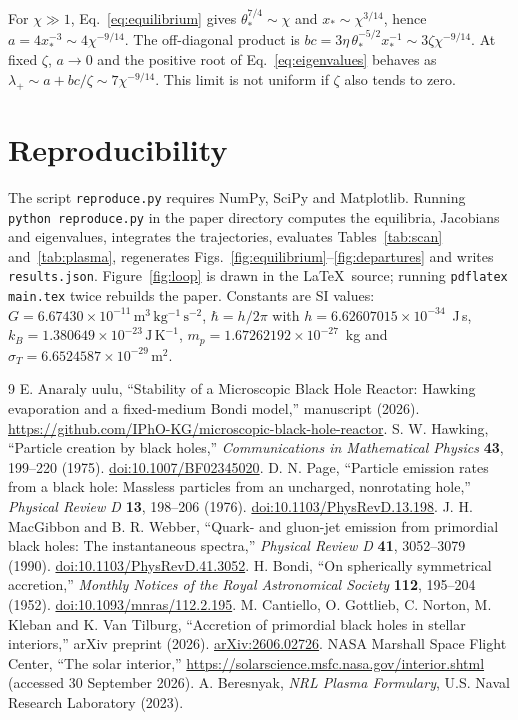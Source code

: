 \documentclass[11pt,a4paper]{article}
\begin{document}
For $\chi\gg1$, Eq.~\eqref{eq:equilibrium} gives $\theta_*^{7/4}\sim\chi$ and $x_*\sim\chi^{3/14}$, hence $a=4x_*^{-3}\sim4\chi^{-9/14}$. The off-diagonal product is $bc=3\eta\,\theta_*^{-5/2}x_*^{-1}\sim3\zeta\chi^{-9/14}$. At fixed $\zeta$, $a\to0$ and the positive root of Eq.~\eqref{eq:eigenvalues} behaves as $\lambda_+\sim a+bc/\zeta\sim7\chi^{-9/14}$. This limit is not uniform if $\zeta$ also tends to zero.

\section{Reproducibility}\label{app:repro}
The script \texttt{reproduce.py} requires NumPy, SciPy and Matplotlib. Running \texttt{python reproduce.py} in the paper directory computes the equilibria, Jacobians and eigenvalues, integrates the trajectories, evaluates Tables~\ref{tab:scan} and~\ref{tab:plasma}, regenerates Figs.~\ref{fig:equilibrium}--\ref{fig:departures} and writes \texttt{results.json}. Figure~\ref{fig:loop} is drawn in the \LaTeX\ source; running \texttt{pdflatex main.tex} twice rebuilds the paper. Constants are SI values: $G=6.67430\times10^{-11}\,\mathrm{m^3\,kg^{-1}\,s^{-2}}$, $\hbar=h/2\pi$ with $h=6.62607015\times10^{-34}$~J\,s, $k_B=1.380649\times10^{-23}\,\mathrm{J\,K^{-1}}$, $m_p=1.67262192\times10^{-27}$~kg and $\sigma_T=6.6524587\times10^{-29}\,\mathrm{m^2}$.

\begin{thebibliography}{9}
 E. Anaraly uulu, ``Stability of a Microscopic Black Hole Reactor: Hawking evaporation and a fixed-medium Bondi model,'' manuscript (2026). \url{https://github.com/IPhO-KG/microscopic-black-hole-reactor}.
 S. W. Hawking, ``Particle creation by black holes,'' \emph{Communications in Mathematical Physics} \textbf{43}, 199--220 (1975). \href{https://doi.org/10.1007/BF02345020}{doi:10.1007/BF02345020}.
 D. N. Page, ``Particle emission rates from a black hole: Massless particles from an uncharged, nonrotating hole,'' \emph{Physical Review D} \textbf{13}, 198--206 (1976). \href{https://doi.org/10.1103/PhysRevD.13.198}{doi:10.1103/PhysRevD.13.198}.
 J. H. MacGibbon and B. R. Webber, ``Quark- and gluon-jet emission from primordial black holes: The instantaneous spectra,'' \emph{Physical Review D} \textbf{41}, 3052--3079 (1990). \href{https://doi.org/10.1103/PhysRevD.41.3052}{doi:10.1103/PhysRevD.41.3052}.
 H. Bondi, ``On spherically symmetrical accretion,'' \emph{Monthly Notices of the Royal Astronomical Society} \textbf{112}, 195--204 (1952). \href{https://doi.org/10.1093/mnras/112.2.195}{doi:10.1093/mnras/112.2.195}.
 M. Cantiello, O. Gottlieb, C. Norton, M. Kleban and K. Van Tilburg, ``Accretion of primordial black holes in stellar interiors,'' arXiv preprint (2026). \href{https://arxiv.org/abs/2606.02726}{arXiv:2606.02726}.
 NASA Marshall Space Flight Center, ``The solar interior,'' \url{https://solarscience.msfc.nasa.gov/interior.shtml} (accessed 30 September 2026).
 A. Beresnyak, \emph{NRL Plasma Formulary}, U.S. Naval Research Laboratory (2023).
\end{thebibliography}
\end{document}
